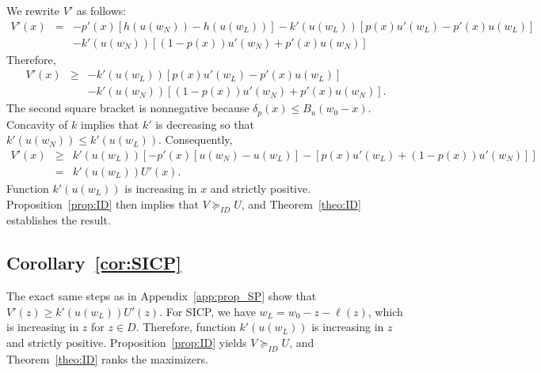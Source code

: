 \documentclass[11pt]{article}
\begin{document}
We rewrite $V'$ as follows:
\begin{eqnarray*}
	V'(x) & = & -p'(x) \left[h(u(w_N))-h(u(w_L)) \right]-k'(u(w_L)) \left[p(x) u'(w_L)-p'(x)u(w_L) \right]  \\
	& & -k'(u(w_N)) \left[(1-p(x)) u'(w_N) + p'(x)u(w_N) \right] 
\end{eqnarray*}
Therefore, 
\begin{eqnarray*}
	V'(x) & \geq & -k'(u(w_L)) \left[p(x) u'(w_L)-p'(x)u(w_L) \right]   \\
	& & -k'(u(w_N)) \left[(1-p(x)) u'(w_N) + p'(x)u(w_N) \right]. 
\end{eqnarray*}
The second square bracket is nonnegative because $\delta_p(x) \leq B_u(w_0-x)$. Concavity of $k$ implies that $k'$ is decreasing so that $k'(u(w_N)) \leq k'(u(w_L))$. Consequently, 
\begin{eqnarray*}
	V'(x) & \geq & k'(u(w_L)) \left[-p'(x)\left[u(w_N)-u(w_L)\right]-\left[p(x) u'(w_L)+(1-p(x)) u'(w_N)\right] \right] \\
	 & = & k'(u(w_L)) U'(x).
\end{eqnarray*} 
Function $k'(u(w_L))$ is increasing in $x$ and strictly positive. Proposition~\ref{prop:ID} then implies that $V \succeq_{ID} U$, and Theorem~\ref{theo:ID} establishes the result.

\subsection{Corollary~\ref{cor:SICP}}\label{app:cor_SICP}

The exact same steps as in Appendix~\ref{app:prop_SP} show that $V'(z) \geq k'(u(w_L)) U'(z)$. For SICP, we have $w_L = w_0-z-\ell(z)$, which is increasing in $z$ for $z \in D$. Therefore, function $k'(u(w_L))$ is increasing in $z$ and strictly positive. Proposition~\ref{prop:ID} yields $V \succeq_{ID} U$, and Theorem~\ref{theo:ID} ranks the maximizers.


\newpage
{\small

} %
\end{document}
